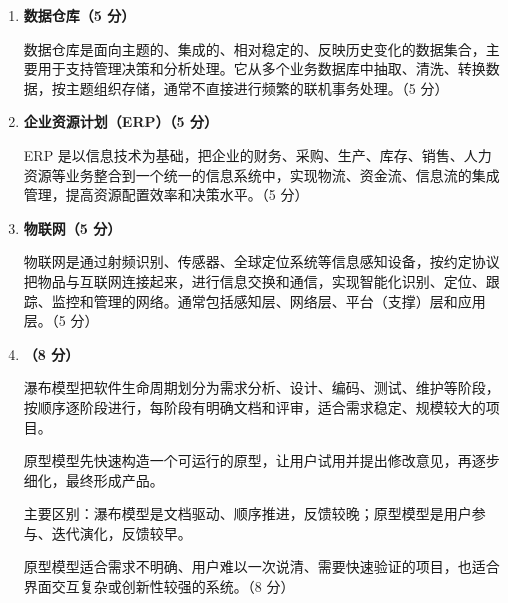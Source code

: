 \documentclass[a4paper,11pt]{article}
\begin{document}

\begin{enumerate}[start=29, label=\textbf{\arabic*.}, leftmargin=2.4em, itemsep=0.55em]

\item \textbf{数据仓库（5 分）}

数据仓库是面向主题的、集成的、相对稳定的、反映历史变化的数据集合，主要用于支持管理决策和分析处理。它从多个业务数据库中抽取、清洗、转换数据，按主题组织存储，通常不直接进行频繁的联机事务处理。\hfill（5 分）

\item \textbf{企业资源计划（ERP）（5 分）}

ERP 是以信息技术为基础，把企业的财务、采购、生产、库存、销售、人力资源等业务整合到一个统一的信息系统中，实现物流、资金流、信息流的集成管理，提高资源配置效率和决策水平。\hfill（5 分）

\item \textbf{物联网（5 分）}

物联网是通过射频识别、传感器、全球定位系统等信息感知设备，按约定协议把物品与互联网连接起来，进行信息交换和通信，实现智能化识别、定位、跟踪、监控和管理的网络。通常包括感知层、网络层、平台（支撑）层和应用层。\hfill（5 分）

\item \textbf{（8 分）}

瀑布模型把软件生命周期划分为需求分析、设计、编码、测试、维护等阶段，按顺序逐阶段进行，每阶段有明确文档和评审，适合需求稳定、规模较大的项目。

原型模型先快速构造一个可运行的原型，让用户试用并提出修改意见，再逐步细化，最终形成产品。

主要区别：瀑布模型是文档驱动、顺序推进，反馈较晚；原型模型是用户参与、迭代演化，反馈较早。

原型模型适合需求不明确、用户难以一次说清、需要快速验证的项目，也适合界面交互复杂或创新性较强的系统。\hfill（8 分）


\end{enumerate}
\end{document}
